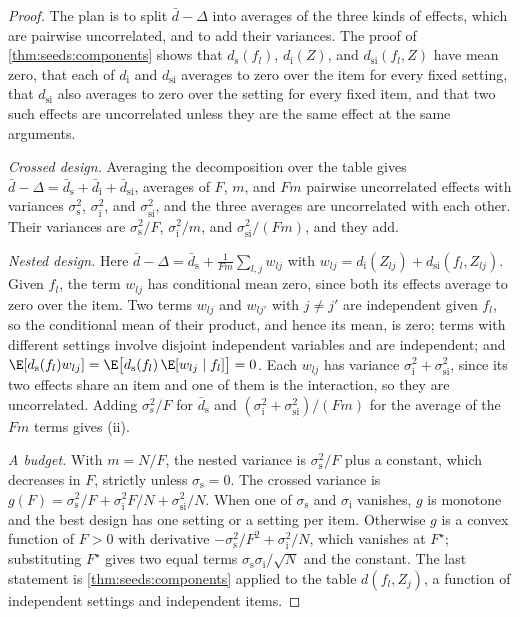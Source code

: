 \begin{refsection}
\begin{proof}
The plan is to split $\bar d-\Delta$ into averages of the three kinds of effects, which are pairwise uncorrelated, and to add their variances. The proof of \cref{thm:seeds:components} shows that $d_{\mathrm s}(f_l)$, $d_{\mathrm i}(Z)$, and $d_{\mathrm{si}}(f_l,Z)$ have mean zero, that each of $d_{\mathrm i}$ and $d_{\mathrm{si}}$ averages to zero over the item for every fixed setting, that $d_{\mathrm{si}}$ also averages to zero over the setting for every fixed item, and that two such effects are uncorrelated unless they are the same effect at the same arguments.

\emph{Crossed design.} Averaging the decomposition over the table gives $\bar d-\Delta=\bar d_{\mathrm s}+\bar d_{\mathrm i}+\bar d_{\mathrm{si}}$, averages of $F$, $m$, and $Fm$ pairwise uncorrelated effects with variances $\sigma_{\mathrm s}^2$, $\sigma_{\mathrm i}^2$, and $\sigma_{\mathrm{si}}^2$, and the three averages are uncorrelated with each other. Their variances are $\sigma_{\mathrm s}^2/F$, $\sigma_{\mathrm i}^2/m$, and $\sigma_{\mathrm{si}}^2/(Fm)$, and they add.

\emph{Nested design.} Here $\bar d-\Delta=\bar d_{\mathrm s}+\frac1{Fm}\sum_{l,j}w_{lj}$ with $w_{lj}=d_{\mathrm i}(Z_{lj})+d_{\mathrm{si}}(f_l,Z_{lj})$. Given $f_l$, the term $w_{lj}$ has conditional mean zero, since both its effects average to zero over the item. Two terms $w_{lj}$ and $w_{lj'}$ with $j\ne j'$ are independent given $f_l$, so the conditional mean of their product, and hence its mean, is zero; terms with different settings involve disjoint independent variables and are independent; and $\E[d_{\mathrm s}(f_l)w_{lj}]=\E\bigl[d_{\mathrm s}(f_l)\,\E[w_{lj}\mid f_l]\bigr]=0$. Each $w_{lj}$ has variance $\sigma_{\mathrm i}^2+\sigma_{\mathrm{si}}^2$, since its two effects share an item and one of them is the interaction, so they are uncorrelated. Adding $\sigma_{\mathrm s}^2/F$ for $\bar d_{\mathrm s}$ and $(\sigma_{\mathrm i}^2+\sigma_{\mathrm{si}}^2)/(Fm)$ for the average of the $Fm$ terms gives (ii).

\emph{A budget.} With $m=N/F$, the nested variance is $\sigma_{\mathrm s}^2/F$ plus a constant, which decreases in $F$, strictly unless $\sigma_{\mathrm s}=0$. The crossed variance is $g(F)=\sigma_{\mathrm s}^2/F+\sigma_{\mathrm i}^2F/N+\sigma_{\mathrm{si}}^2/N$. When one of $\sigma_{\mathrm s}$ and $\sigma_{\mathrm i}$ vanishes, $g$ is monotone and the best design has one setting or a setting per item. Otherwise $g$ is a convex function of $F>0$ with derivative $-\sigma_{\mathrm s}^2/F^2+\sigma_{\mathrm i}^2/N$, which vanishes at $F^\star$; substituting $F^\star$ gives two equal terms $\sigma_{\mathrm s}\sigma_{\mathrm i}/\sqrt N$ and the constant. The last statement is \cref{thm:seeds:components} applied to the table $d(f_l,Z_j)$, a function of independent settings and independent items.
\end{proof}


\end{refsection}
